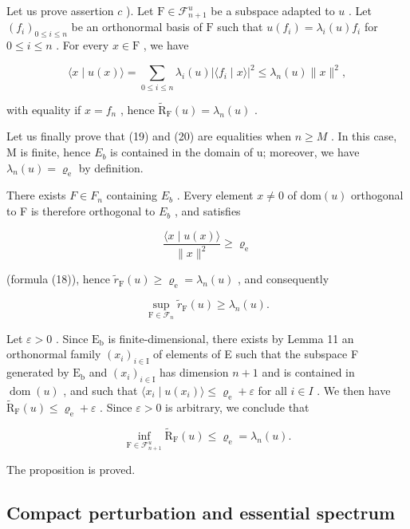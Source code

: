 Let us prove assertion \(c\) ). Let \(\mathrm{F} \in \mathcal{F}_{n+1}^{u}\) be a subspace adapted to \(u\) . Let \((f_{i})_{0 \leqslant i \leqslant n}\) be an orthonormal basis of \(\mathrm{F}\) such that \(u(f_{i}) = \lambda_{i}(u)f_{i}\) for \(0 \leqslant i \leqslant n\) . For every \(x \in \mathrm{F}\) , we have

\[
\langle x \mid u (x) \rangle = \sum_ {0 \leqslant i \leqslant n} \lambda_ {i} (u) | \langle f _ {i} \mid x \rangle | ^ {2} \leqslant \lambda_ {n} (u) \| x \| ^ {2},
\]

with equality if \(x = f_{n}\) , hence \(\widetilde{\mathrm{R}}_{\mathrm{F}}(u) = \lambda_{n}(u)\) .

Let us finally prove that (19) and (20) are equalities when \(n \geqslant M\) . In this case, M is finite, hence \(E_{b}\) is contained in the domain of u; moreover, we have \(\lambda_{n}(u) = \varrho_{\mathrm{e}}\) by definition.

There exists \(F \in F_{n}\) containing \(E_{b}\) . Every element \(x \neq 0\) of \(\text{dom}(u)\) orthogonal to F is therefore orthogonal to \(E_{b}\) , and satisfies

\[
\frac {\langle x \mid u (x) \rangle}{\| x \| ^ {2}} \geqslant \varrho_ {\mathrm{e}}
\]

(formula (18)), hence \(\widetilde{r}_{\mathrm{F}}(u) \geqslant \varrho_{\mathrm{e}} = \lambda_n(u)\) , and consequently

\[
\sup _ {\mathrm{F} \in \mathcal {F} _ {n}} \widetilde {r} _ {\mathrm{F}} (u) \geqslant \lambda_ {n} (u).
\]

Let \(\varepsilon > 0\) . Since \(\mathrm{E_b}\) is finite-dimensional, there exists by Lemma 11 an orthonormal family \((x_i)_{i \in \mathrm{I}}\) of elements of E such that the subspace F generated by \(\mathrm{E_b}\) and \((x_i)_{i \in \mathrm{I}}\) has dimension \(n + 1\) and is contained in \(\operatorname{dom}(u)\) , and such that \(\langle x_{i} \mid u(x_{i})\rangle \leqslant \varrho_{\mathrm{e}} + \varepsilon\) for all \(i \in I\) . We then have \(\widetilde{\mathrm{R}}_{\mathrm{F}}(u) \leqslant \varrho_{\mathrm{e}} + \varepsilon\) . Since \(\varepsilon > 0\) is arbitrary, we conclude that

\[
\inf _ {\mathrm{F} \in \mathcal {F} _ {n + 1} ^ {u}} \widetilde {\mathrm{R}} _ {\mathrm{F}} (u) \leqslant \varrho_ {\mathrm{e}} = \lambda_ {n} (u).
\]

The proposition is proved.

\subsection{Compact perturbation and essential spectrum}

